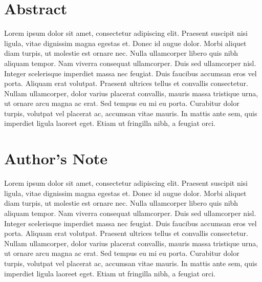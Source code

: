 





\chapter*{Abstract}		%
\begin{singlespacing}

Lorem ipsum dolor sit amet, consectetur adipiscing elit. Praesent suscipit nisi ligula, vitae dignissim magna egestas et. Donec id augue dolor. Morbi aliquet diam turpis, ut molestie est ornare nec. Nulla ullamcorper libero quis nibh aliquam tempor. Nam viverra consequat ullamcorper. Duis sed ullamcorper nisl. Integer scelerisque imperdiet massa nec feugiat. Duis faucibus accumsan eros vel porta. Aliquam erat volutpat. Praesent ultrices tellus et convallis consectetur. Nullam ullamcorper, dolor varius placerat convallis, mauris massa tristique urna, ut ornare arcu magna ac erat. Sed tempus eu mi eu porta. Curabitur dolor turpis, volutpat vel placerat ac, accumsan vitae mauris. In mattis ante sem, quis imperdiet ligula laoreet eget. Etiam ut fringilla nibh, a feugiat orci.

\end{singlespacing}

\chapter*{Author's Note}		%
\begin{singlespacing}

Lorem ipsum dolor sit amet, consectetur adipiscing elit. Praesent suscipit nisi ligula, vitae dignissim magna egestas et. Donec id augue dolor. Morbi aliquet diam turpis, ut molestie est ornare nec. Nulla ullamcorper libero quis nibh aliquam tempor. Nam viverra consequat ullamcorper. Duis sed ullamcorper nisl. Integer scelerisque imperdiet massa nec feugiat. Duis faucibus accumsan eros vel porta. Aliquam erat volutpat. Praesent ultrices tellus et convallis consectetur. Nullam ullamcorper, dolor varius placerat convallis, mauris massa tristique urna, ut ornare arcu magna ac erat. Sed tempus eu mi eu porta. Curabitur dolor turpis, volutpat vel placerat ac, accumsan vitae mauris. In mattis ante sem, quis imperdiet ligula laoreet eget. Etiam ut fringilla nibh, a feugiat orci.

\end{singlespacing}


